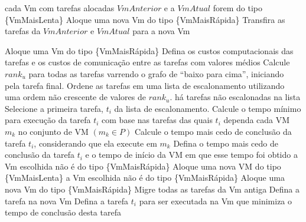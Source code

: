 \begin{codebox}
	\li \For cada Vm com tarefas alocadas
		\li \Do \If $VmAnterior$ e a $VmAtual$ forem do tipo \{VmMaisLenta\}
			\li \Do Aloque uma nova Vm do tipo \{VmMaisRápida\}
			\li Transfira as tarefas da $VmAnterior$ e $VmAtual$ para a nova Vm
		\End
	\End
\end{codebox}


\begin{codebox}
\li Aloque uma Vm do tipo \{VmMaisRápida\}
\li	Defina os custos computacionais das tarefas e os custos de comunicação entre as tarefas
\zi com valores médios
\li	Calcule $rank_u$ para todas as tarefas varrendo o grafo de ``baixo para cima'',
	iniciando \\pela tarefa final.
\li Ordene as tarefas em uma lista de escalonamento utilizando uma ordem não
\zi crescente de valores de $rank_u$.
\li 	\While há tarefas não escalonadas na lista
\li 		\Do
				Selecione a primeira tarefa, $t_i$ da lista de escalonamento.
\li 			Calcule o tempo mínimo para execução da tarefa $t_i$ com base nas tarefas
\zi das quais $t_i$ dependa				
\li				\For cada VM $m_k$ no conjunto de VM $(m_k \in P)$
\li 				\Do
						Calcule o tempo mais cedo de conclusão da tarefa  $t_i$,
						considerando que ela execute 
\zi         em $m_k$
					\End
\li				Defina o tempo mais cedo de conclusão da tarefa $t_i$ e o tempo
				de início da VM em que esse tempo foi obtido
\li			\If a Vm escolhida não é do tipo \{VmMaisRápida\}
\li				\Then
					Aloque uma nova VM do tipo \{VmMaisLenta\}
\li				\Else
\li					\If a Vm escolhida não é do tipo \{VmMaisRápida\}
\li 					\Then
							Aloque uma nova Vm do tipo \{VmMaisRápida\}
\li							Migre todas as tarefas da Vm antiga
\li 						Defina a tarefa na nova Vm
\li						\Else
\li							Defina a tarefa $t_i$ para ser executada na Vm que
							minimiza o tempo de
\zi							conclusão desta tarefa
						\End
				\End
			\End
\End
\end{codebox}

